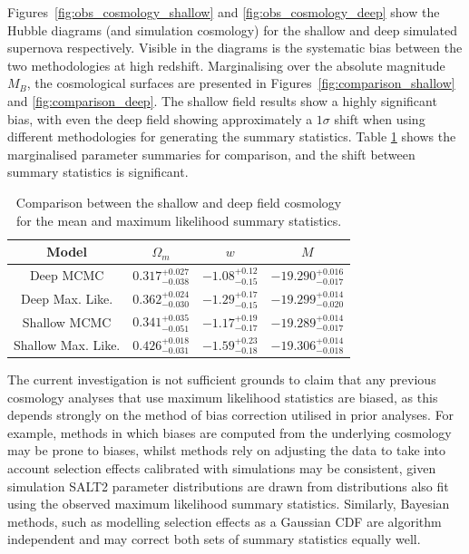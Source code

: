 \documentclass[a4paper,fleqn,usenatbib]{mnras}
\begin{document}
Figures~\ref{fig:obs_cosmology_shallow} and \ref{fig:obs_cosmology_deep} show the Hubble diagrams (and simulation cosmology) for the shallow and deep simulated supernova respectively. Visible in the diagrams is the systematic bias between the two methodologies at high redshift. Marginalising over the absolute magnitude $M_B$, the cosmological surfaces are presented in Figures~\ref{fig:comparison_shallow} and \ref{fig:comparison_deep}. The shallow field results show a highly significant bias, with even the deep field showing approximately a $1\sigma$ shift when using different methodologies for generating the summary statistics. Table \ref{tab:unbias_comp} shows the marginalised parameter summaries for comparison, and the shift between summary statistics is significant.

\begin{table}
	\centering
	\caption{Comparison between the shallow and deep field cosmology for the mean and maximum likelihood summary statistics.}
	\label{tab:unbias_comp}
    \begin{tabular}{cccc}
       	\hline
       	Model & $\Omega_m$ & $w$ & $M$ \\ 
       	\hline
       	Deep MCMC & $0.317^{+0.027}_{-0.038}$ & $-1.08^{+0.12}_{-0.15}$ & $-19.290^{+0.016}_{-0.017}$ \\ 
       	Deep Max. Like. & $0.362^{+0.024}_{-0.030}$ & $-1.29^{+0.17}_{-0.15}$ & $-19.299^{+0.014}_{-0.020}$ \\ 
       	Shallow MCMC & $0.341^{+0.035}_{-0.051}$ & $-1.17^{+0.19}_{-0.17}$ & $-19.289^{+0.014}_{-0.017}$ \\ 
       	Shallow Max. Like. & $0.426^{+0.018}_{-0.031}$ & $-1.59^{+0.23}_{-0.18}$ & $-19.306^{+0.014}_{-0.018}$ \\ 
       	\hline
    \end{tabular}
\end{table}

The current investigation is not sufficient grounds to claim that any previous cosmology analyses that use maximum likelihood statistics are biased, as this depends strongly on the method of bias correction utilised in prior analyses. For example, methods in which biases are computed from the underlying cosmology may be prone to biases, whilst methods rely on adjusting the data to take into account selection effects calibrated with simulations \citep{KesslerBecker2009, ConleyGuy2011} may be consistent, given simulation SALT2 parameter distributions are drawn from distributions also fit using the observed maximum likelihood summary statistics. Similarly, Bayesian methods, such as modelling selection effects as a Gaussian CDF \citep{RubinAldering2015} are algorithm independent and may correct both sets of summary statistics equally well.
\end{document}
